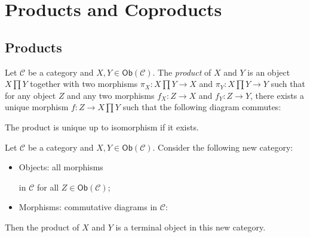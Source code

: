 \documentclass[
	11pt, %
	fleqn, %
	a4paper, %
]{LegrandOrangeBook}
\newcommand{\C}{\mathcal{C}} %
\newcommand{\Ob}[1]{\mathsf{Ob}(#1)} %
\begin{document}
\section{Products and Coproducts}

\subsection{Products}

\begin{definition}[Products]
    Let $\C$ be a category and $X, Y \in \Ob{\C}$. The \emph{product} of $X$ and $Y$ is an object $X \prod Y$ together with two morphisms $\pi_X : X \prod Y \to X$ and $\pi_Y : X \prod Y \to Y$ such that for any object $Z$ and any two morphisms $f_X : Z \to X$ and $f_Y : Z \to Y$, there exists a unique morphism $f : Z \to X \prod Y$ such that the following diagram commutes:
    \begin{center}
    \end{center}
\end{definition}

\begin{remark}
    The product is unique up to isomorphism if it exists.
\end{remark}

\begin{corollary}
    Let $\C$ be a category and $X, Y \in \Ob{\C}$. Consider the following new category:
    \begin{itemize}
        \item Objects: all morphisms  in $\C$ for all $Z \in \Ob{\C}$;
        \item Morphisms: commutative diagrams in $\C$:
    \end{itemize}
    \begin{center}
    \end{center}
    Then the product of $X$ and $Y$ is a terminal object in this new category.
\end{corollary}
\end{document}
